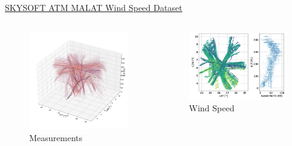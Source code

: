 \documentclass[aspectratio=169]{beamer}
\begin{document}
\begin{frame}{\href{https://www.idiap.ch/en/dataset/skysoft}{SKYSOFT ATM MALAT Wind Speed Dataset}}
    \begin{columns}
        \begin{column}{0.5\textwidth}
            \begin{figure}[htbp]
                \centering
                \includegraphics[height=0.6\textheight]{imgs/dataset.pdf}
                \caption{Measurements}
            \end{figure}
        \end{column}
        \begin{column}{0.5\textwidth}
            \begin{figure}[htbp]
                \centering
                \includegraphics[height=0.5\textheight]{imgs/windspeed-rast.png}
                \caption{Wind Speed}
            \end{figure}
        \end{column}
    \end{columns}
\end{frame}
\end{document}
